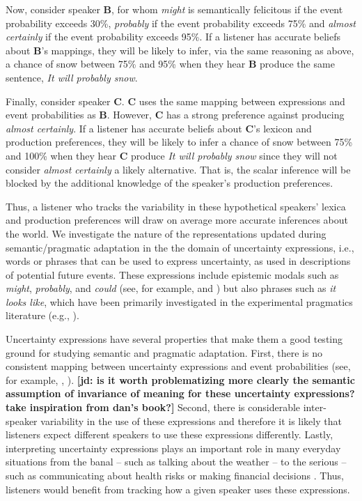 \documentclass[lucida,biblatex]{sp} %
\newcommand{\jd}[1]{\textcolor{PinkyPurple}{\textbf{[jd: #1]}}}
\begin{document}
Now, consider speaker {\bf B}, for whom \textit{might} is semantically felicitous if the event probability exceeds 30\%, 
\textit{probably} if the event probability exceeds 75\% and \textit{almost certainly}  if the event probability exceeds 95\%. If a listener has
accurate beliefs about {\bf B}'s mappings, they will be likely to infer, via the same reasoning as above, a chance of snow between 75\% and 95\% when they hear {\bf B} produce the same sentence, \textit{It will probably snow}.

Finally, consider speaker {\bf C}. {\bf C} uses the same mapping between expressions and event probabilities as {\bf B}. However, {\bf C} has a strong preference against 
producing \textit{almost certainly}. If a listener has accurate beliefs about {\bf C}'s lexicon and production preferences, 
they will be likely to infer a chance of snow between 75\% and 100\% when they hear {\bf C} produce \textit{It will probably snow} since they will not
consider  \textit{almost certainly} a likely alternative. That is, the scalar inference will be blocked by the additional knowledge of the speaker's production preferences. 

Thus, a listener who tracks the variability in these hypothetical speakers' lexica and production preferences will draw on average more accurate inferences about the world. We investigate the nature of the representations updated during semantic/pragmatic adaptation in the the domain of uncertainty expressions, i.e., words or phrases that can be used to express uncertainty, as used in descriptions of potential future events. These expressions include epistemic modals such as \textit{might}, 
\textit{probably}, and \textit{could} (see, for example, \citep{Kratzer1991} and \citep{Hacquard2011}) but also phrases such as \textit{it looks like}, which have been primarily investigated in the experimental pragmatics literature (e.g., \cite{Kurumada2014,Pogue2018}).

Uncertainty expressions have several properties that make them a good testing ground for studying semantic and pragmatic
adaptation. First, there is no consistent mapping between uncertainty expressions and event probabilities
(see, for example, \citet{Clark1990}, \citet{PepperPrytulak1974}). \jd{is it worth problematizing more clearly the semantic assumption of invariance of meaning for these uncertainty expressions? take inspiration from dan's book?} Second, there is considerable inter-speaker variability 
in the use of these expressions \citep{Wallsten1986} and therefore it is likely that listeners expect different speakers to use these expressions
differently. Lastly, interpreting uncertainty expressions plays an important role in many everyday situations from the banal -- such as talking about the weather -- to the serious -- such as communicating about health risks \citep{Berry2004, Lipkus2007, Politi2007} or making financial decisions \citep{Doupnik2003}. 
Thus, listeners would benefit from tracking  how a given speaker uses these expressions. %
\end{document}
